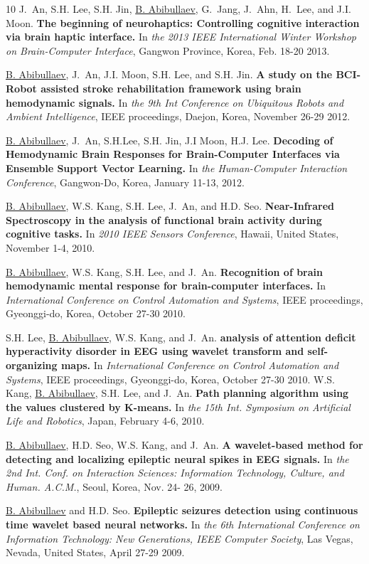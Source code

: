 \documentclass[10pt,letterpaper,sans]{moderncv}   %
\begin{document}
\begin{thebibliography}{10}
J.~An, S.H. Lee, S.H. Jin, \underline{B. Abibullaev}, G.~Jang, J.~Ahn, H.~Lee,  and J.I. Moon.
\newblock \textbf{The beginning of neurohaptics: Controlling cognitive interaction via brain haptic interface.}
\newblock In {\em the 2013 IEEE International Winter Workshop on Brain-Computer Interface}, Gangwon Province, Korea, Feb. 18-20 2013.

\underline{B. Abibullaev}, J.~An, J.I. Moon, S.H. Lee, and S.H. Jin.
\newblock \textbf{A study on the {BCI}-{Robot} assisted stroke rehabilitation framework using brain hemodynamic signals.}
\newblock In {\em the 9th Int Conference on Ubiquitous Robots and Ambient Intelligence}, IEEE proceedings, Daejon, Korea, November 26-29 2012.

\underline{B. Abibullaev}, J.~An, S.H.Lee, S.H. Jin, J.I Moon, H.J. Lee.
\newblock \textbf{Decoding of Hemodynamic Brain Responses for Brain-Computer Interfaces via Ensemble Support Vector Learning.}
\newblock In {\em the Human-Computer Interaction Conference}, Gangwon-Do, Korea, January 11-13, 2012.

\underline{B. Abibullaev}, W.S. Kang, S.H. Lee, J.~An, and H.D. Seo.
\newblock \textbf{Near-Infrared Spectroscopy in the analysis of functional brain activity during cognitive tasks.}
\newblock In {\em 2010 IEEE Sensors Conference}, Hawaii, United States, November 1-4, 2010.

\underline{B. Abibullaev}, W.S. Kang, S.H. Lee, and J.~An.
\newblock \textbf{Recognition of brain hemodynamic mental response for brain-computer interfaces.}
\newblock In {\em International Conference on Control Automation and Systems}, IEEE proceedings,  Gyeonggi-do, Korea, October 27-30 2010.

S.H. Lee, \underline{B. Abibullaev}, W.S. Kang, and J.~An.
\newblock \textbf{analysis of attention deficit hyperactivity disorder in {EEG} using wavelet transform and self-organizing maps.}
\newblock In {\em International Conference on Control Automation and Systems}, IEEE proceedings, Gyeonggi-do, Korea, October 27-30 2010.
%
W.S. Kang, \underline{B. Abibullaev}, S.H. Lee, and J.~An.
\newblock \textbf{Path planning algorithm using the values clustered by K-means.}
\newblock In {\em the 15th Int. Symposium on Artificial Life and Robotics}, Japan, February 4-6, 2010.

\underline{B. Abibullaev}, H.D. Seo, W.S. Kang, and J.~An.
\newblock \textbf{A wavelet-based method for detecting and localizing epileptic neural spikes in {EEG} signals.}
\newblock In {\em the 2nd Int. Conf. on Interaction Sciences: Information Technology, Culture, and Human. A.C.M.}, Seoul, Korea,  Nov. 24- 26, 2009.

\underline{B. Abibullaev} and H.D. Seo.
\newblock \textbf{Epileptic seizures detection using continuous time wavelet based neural networks.}
\newblock In {\em the 6th International Conference on Information Technology: New Generations, IEEE Computer Society}, Las Vegas, Nevada, United States, April 27-29 2009.

\end{thebibliography}
\end{document}
